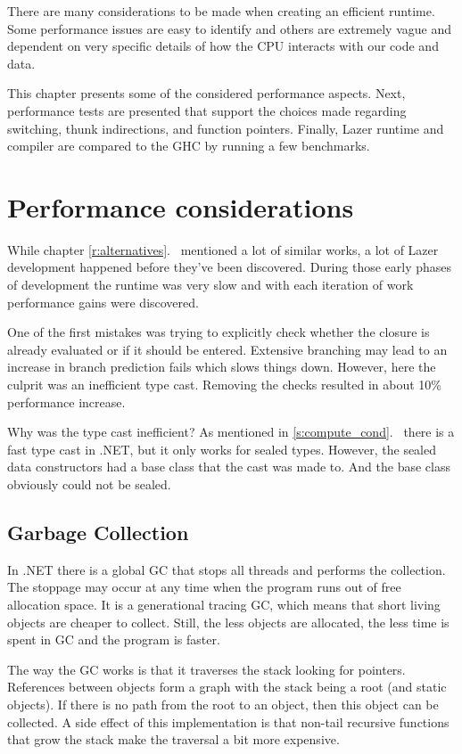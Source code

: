 \documentclass[en]{pracamgr}
\newcommand{\myref}[1]{\ref{#1}.~\textit{\nameref{#1}}}
\begin{document}
There are many considerations to be made when creating
an efficient runtime. Some performance issues are easy
to identify and others are extremely vague and dependent
on very specific details of how the CPU interacts with
our code and data.

This chapter presents some of the considered performance aspects.
Next, performance tests are presented that support the choices
made regarding switching, thunk indirections, and function pointers.
Finally, Lazer runtime and compiler are compared to the GHC by running
a few benchmarks.

\section{Performance considerations}

While chapter \myref{r:alternatives} mentioned a lot of similar
works, a lot of Lazer development happened before they've been
discovered. During those early phases of development the runtime
was very slow and with each iteration of work performance gains were
discovered.

One of the first mistakes was trying to explicitly check whether
the closure is already evaluated or if it should be entered.
Extensive branching may lead to an increase in branch
prediction fails which slows things down.
However, here the culprit was an inefficient type cast.
Removing the checks resulted in about 10\% performance increase.

Why was the type cast inefficient? As mentioned in \myref{s:compute_cond}
there is a fast type cast in .NET, but it only works for
sealed types. However, the sealed data constructors had a
base class that the cast was made to. And the base class
obviously could not be sealed.

\subsection{Garbage Collection}

In .NET there is a global GC that stops all threads
and performs the collection.
The stoppage may occur at any time when the program
runs out of free allocation space.
It is a generational tracing GC,
which means that short living objects are cheaper to collect.
Still, the less objects are allocated, the less time is
spent in GC and the program is faster.

The way the GC works is that it traverses the stack looking
for pointers. References between objects form a graph with
the stack being a root (and static objects). If there is no path from the root
to an object, then this object can be collected.
A side effect of this implementation is that
non-tail recursive functions that grow the stack
make the traversal a bit more expensive.
\end{document}
